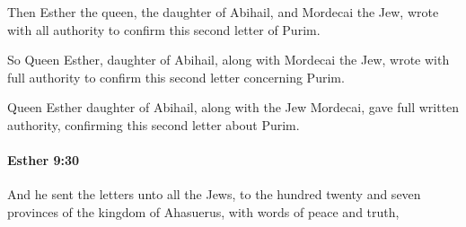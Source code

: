 			\begin{versebox}
					\item[BHS] 
					\item[LXX] 
					\item[ASV] Then Esther the queen, the daughter of Abihail, and Mordecai the Jew, wrote with all authority to confirm this second letter of Purim.
					\item[NIV] So Queen Esther, daughter of Abihail, along with Mordecai the Jew, wrote with full authority to confirm this second letter concerning Purim.
					\item[NRSV] Queen Esther daughter of Abihail, along with the Jew Mordecai, gave full written authority, confirming this second letter about Purim.
			\end{versebox}

		\paragraph{Esther 9:30} %
			\label{ESTHER-9-30}

			And he sent the letters unto all the Jews, to the hundred twenty and seven provinces of the kingdom of Ahasuerus, with words of peace and truth,

